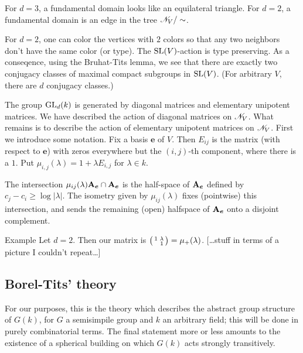 For $d=3$, a fundamental domain looks like an equilateral triangle. For 
$d=2$, a fundamental domain is an edge in the tree 
$\mathscr{N}_V/\sim$. 

For $d=2$, one can color the vertices with $2$ colors so that any two neighbors 
don't have the same color (or type). The 
$\operatorname{SL}(V)$-action is type preserving. As a conseqence, using 
the Bruhat-Tits lemma, we see that there are exactly two conjugacy classes of 
maximal compact subgroups in $\operatorname{SL}(V)$. (For arbitrary $V$, there are 
$d$ conjugacy classes.) 

The group $\operatorname{GL}_d(k)$ is generated by diagonal matrices and elementary 
unipotent matrices. We have described the action of diagonal matrices on 
$\mathscr{N}_V$. What remains is to describe the action of elementary unipotent matrices 
on $\mathscr{N}_V$. First we introduce some notation. Fix a basis 
$\boldsymbol e$ of $V$. Then $E_{i j}$ is the matrix (with respect to 
$\boldsymbol e$) with zeros everywhere but the $(i,j)$-th component, where there 
is a $1$. Put $\mu_{i,j}(\lambda) = 1+\lambda E_{i,j}$ for 
$\lambda\in k$. 

\begin{prop}
The intersection 
$\mu_{i j}(\lambda) \mathbf{A}_{\boldsymbol e} \cap \mathbf{A}_{\boldsymbol e}$ is the half-space 
of $\mathbf{A}_{\boldsymbol e}$ defined by 
$c_j-c_i \geqslant \log |\lambda|$. The isometry given by 
$\mu_{i j}(\lambda)$ fixes (pointwise) this intersection, and sends the remaining 
(open) halfspace of $\mathbf{A}_{\boldsymbol e}$ onto a disjoint complement. 
\end{prop}

\begin{enonce}{Example}
Let $d=2$. Then our matrix is $\bigl(\begin{smallmatrix} 1 & \lambda \\  & 1 \end{smallmatrix} \bigr) = \mu_+(\lambda)$. 
[\ldots stuff in terms of a picture I couldn't repeat\ldots]
\end{enonce}





\subsection{Borel-Tits' theory}

For our purposes, this is the theory which describes the abstract group structure 
of $G(k)$, for $G$ a semisimpile group and $k$ an arbitrary field; this will be done in 
purely combinatorial terms. The final statement more or less amounts to the existence 
of a spherical building on which $G(k)$ acts strongly transitively. 


